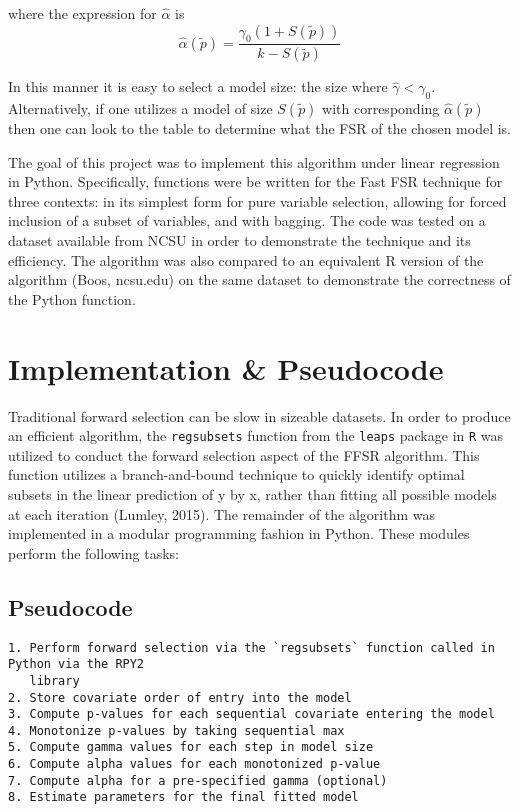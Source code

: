 \documentclass{article}
\begin{document}
where the expression for $\hat{\alpha}$ is
\[ \hat{\alpha}(\tilde{p}) = \frac{\gamma_0(1+S(\tilde{p}))}{k - S(\tilde{p})}\]

In this manner it is easy to select a model size: the size where
$\hat{\gamma} < \gamma_0$. Alternatively, if one utilizes a model of
size $S(\tilde{p})$ with corresponding $\hat{\alpha}(\tilde{p})$ then
one can look to the table to determine what the FSR of the chosen model
is.

The goal of this project was to implement this algorithm under linear
regression in Python. Specifically, functions were be written for the
Fast FSR technique for three contexts: in its simplest form for pure
variable selection, allowing for forced inclusion of a subset of
variables, and with bagging. The code was tested on a dataset available
from NCSU in order to demonstrate the technique and its efficiency. The
algorithm was also compared to an equivalent R version of the algorithm
(Boos, ncsu.edu) on the same dataset to demonstrate the correctness of
the Python function.

    \section{Implementation \& Pseudocode}\label{implementation-pseudocode}

Traditional forward selection can be slow in sizeable datasets. In order
to produce an efficient algorithm, the \texttt{regsubsets} function from
the \texttt{leaps} package in \texttt{R} was utilized to conduct the
forward selection aspect of the FFSR algorithm. This function utilizes a
branch-and-bound technique to quickly identify optimal subsets in the
linear prediction of y by x, rather than fitting all possible models at
each iteration (Lumley, 2015). The remainder of the algorithm was
implemented in a modular programming fashion in Python. These modules
perform the following tasks:

    \subsection{Pseudocode}\label{pseudocode}

\begin{verbatim}
1. Perform forward selection via the `regsubsets` function called in Python via the RPY2 
   library
2. Store covariate order of entry into the model
3. Compute p-values for each sequential covariate entering the model
4. Monotonize p-values by taking sequential max
5. Compute gamma values for each step in model size
6. Compute alpha values for each monotonized p-value
7. Compute alpha for a pre-specified gamma (optional)
8. Estimate parameters for the final fitted model
\end{verbatim}
\end{document}

